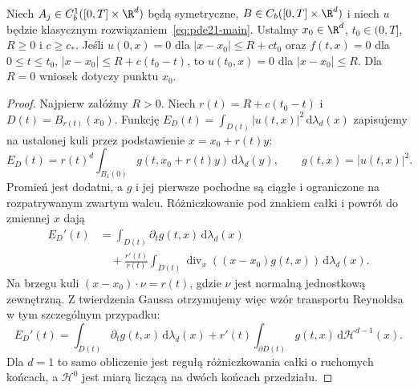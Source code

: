 \begin{twierdzenie}\label{thm:pde21-cone}
Niech $A_j\in C^1_b([0,T]\times\R^d)$ będą symetryczne,
$B\in C_b([0,T]\times\R^d)$ i niech $u$ będzie klasycznym
rozwiązaniem~\eqref{eq:pde21-main}. Ustalmy $x_0\in\R^d$,
$t_0\in(0,T]$, $R\ge0$ i $c\ge c_*$. Jeśli
$u(0,x)=0$ dla $|x-x_0|\le R+ct_0$ oraz
$f(t,x)=0$ dla $0\le t\le t_0$, $|x-x_0|\le R+c(t_0-t)$,
to $u(t_0,x)=0$ dla $|x-x_0|\le R$.
Dla $R=0$ wniosek dotyczy punktu $x_0$.
\end{twierdzenie}
\begin{proof}
Najpierw załóżmy $R>0$. Niech $r(t)=R+c(t_0-t)$
i $D(t)=B_{r(t)}(x_0)$. Funkcję
$E_D(t)=\int_{D(t)}|u(t,x)|^2\,\mathrm d\lambda_d(x)$
zapisujemy na ustalonej kuli przez podstawienie
$x=x_0+r(t)y$:
\[
 E_D(t)=r(t)^d\int_{B_1(0)}
 g(t,x_0+r(t)y)\,\mathrm d\lambda_d(y),\qquad
 g(t,x)=|u(t,x)|^2.
\]
Promień jest dodatni, a $g$ i jej pierwsze pochodne
są ciągłe i ograniczone na rozpatrywanym zwartym
walcu. Różniczkowanie pod znakiem całki i powrót
do zmiennej $x$ dają
\[
 \begin{split}
 E_D'(t)
 &=\int_{D(t)}\partial_tg(t,x)\,\mathrm d\lambda_d(x)\\
 &\quad+\frac{r'(t)}{r(t)}
 \int_{D(t)}\operatorname{div}_x((x-x_0)g(t,x))
 \,\mathrm d\lambda_d(x).
 \end{split}
\]
Na brzegu kuli $(x-x_0)\cdot\nu=r(t)$, gdzie
$\nu$ jest normalną jednostkową zewnętrzną. Z twierdzenia
Gaussa otrzymujemy więc wzór transportu Reynoldsa
w tym szczególnym przypadku:
\[
 E_D'(t)=\int_{D(t)}\partial_tg(t,x)\,\mathrm d\lambda_d(x)
 +r'(t)\int_{\partial D(t)}g(t,x)\,\mathrm d\mathcal H^{d-1}(x).
\]
Dla $d=1$ to samo obliczenie jest regułą różniczkowania
całki o ruchomych końcach, a $\mathcal H^0$ jest miarą
liczącą na dwóch końcach przedziału.


\end{proof}
